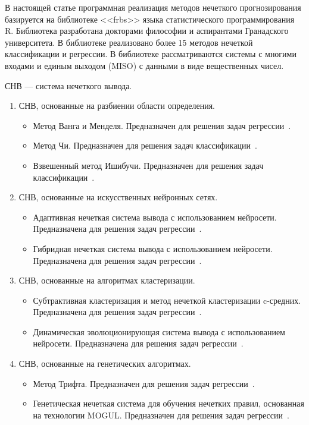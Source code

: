 В настоящей статье программная реализация методов нечеткого прогнозирования
базируется на библиотеке <<frbs>> языка статистического программирования R. Библиотека разработана докторами философии и аспирантами Гранадского университета. В библиотеке реализовано более 15 методов нечеткой классификации и регрессии. В библиотеке рассматриваются системы с многими входами и единым выходом (MISO) с данными в виде вещественных чисел.

СНВ --- система нечеткого вывода.
\begin{enumerate}
\item СНВ, основанные на разбиении области определения.
\begin{itemize}
\item Метод Ванга и Менделя. Предназначен для решения задач регрессии~\cite{Wang1992}.
\item Метод Чи. Предназначен для решения задач классификации~\cite{Chi1996}.
\item Взвешенный метод Ишибучи. Предназначен для решения задач классификации~\cite{Ishibuchi2001}.
\end{itemize}
\item СНВ, основанные на искусственных нейронных сетях.
\begin{itemize}
	\item Адаптивная нечеткая система вывода с использованием нейросети. Предназначена для решения задач регрессии~\cite{Jan1993}. 
	\item Гибридная нечеткая система вывода с использованием нейросети.  Предназначена для решения задач регрессии~\cite{Kim1999}.
\end{itemize}
\item СНВ, основанные на алгоритмах кластеризации.
\begin{itemize}
	\item Субтрактивная кластеризация и метод нечеткой кластеризации c-средних.
	Предназначена для решения задач регрессии~\cite{Chiu1996}.
	\item Динамическая эволюционирующая система вывода с использованием нейросети. Предназначена для решения задач регрессии~\cite{Kasabov2002}.
\end{itemize}	
\item СНВ, основанные на генетических алгоритмах.
\begin{itemize}
	\item Метод Трифта. Предназначен для решения задач регрессии~\cite{Thrift1991}.
	\item Генетическая нечеткая система для обучения нечетких правил, основанная на технологии MOGUL. Предназначен для решения задач регрессии~\cite{Cordon1999}.

\end{itemize}
\end{enumerate}
